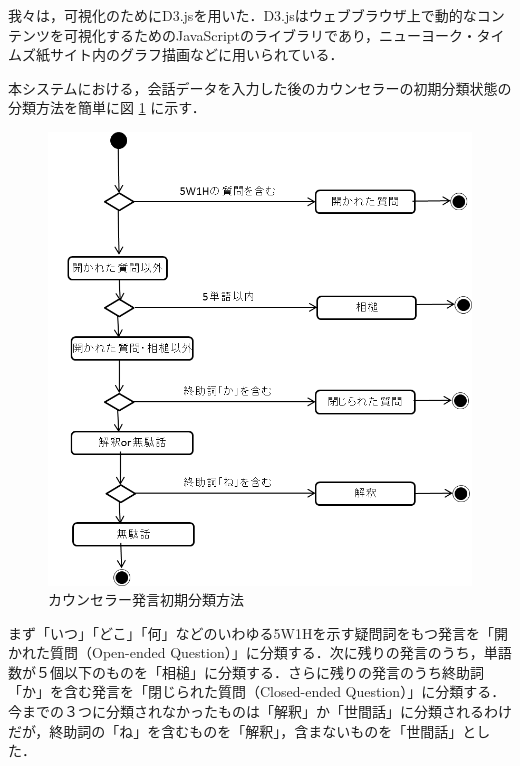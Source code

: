 \documentclass[shuuron]{kuee}
\begin{document}

我々は，可視化のためにD3.js\cite{vand3}を用いた．D3.jsはウェブブラウザ上で動的なコンテンツを可視化するためのJavaScriptのライブラリであり，ニューヨーク・タイムズ紙サイト内のグラフ描画などに用いられている．



本システムにおける，会話データを入力した後のカウンセラーの初期分類状態の分類方法を簡単に図
 \ref{fig:5_2}
に示す．
 \begin{figure}
    \begin{center}
      \includegraphics[width=\linewidth]{5_2.png}
    \end{center}
    \caption{カウンセラー発言初期分類方法}
    \label{fig:5_2}
  \end{figure}
まず「いつ」「どこ」「何」などのいわゆる5W1Hを示す疑問詞をもつ発言を「開かれた質問（Open-ended Question）」に分類する．次に残りの発言のうち，単語数が５個以下のものを「相槌」に分類する．さらに残りの発言のうち終助詞「か」を含む発言を「閉じられた質問（Closed-ended Question）」に分類する．今までの３つに分類されなかったものは「解釈」か「世間話」に分類されるわけだが，終助詞の「ね」を含むものを「解釈」，含まないものを「世間話」とした．
\end{document}
